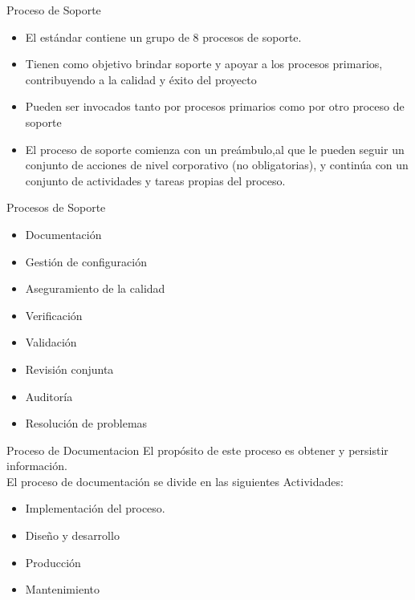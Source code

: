 \documentclass{beamer}
\begin{document}
			\begin{frame}{Proceso de Soporte}
				\begin{itemize}
					\item El estándar contiene un grupo de 8 procesos de soporte.
					\item Tienen como objetivo brindar soporte y apoyar a los procesos primarios, contribuyendo a la calidad y éxito del proyecto
					\item Pueden ser invocados tanto por procesos primarios como por otro proceso de soporte
					\item El proceso de soporte comienza con un preámbulo,al que le pueden seguir un conjunto de acciones de nivel corporativo (no obligatorias), y continúa con un conjunto de actividades y tareas propias del proceso.
				\end{itemize}
			\end{frame}
			
			\begin{frame}{Procesos de Soporte}
				\begin{itemize}
					\item Documentación
					\item Gestión de configuración
					\item Aseguramiento de la calidad
					\item Verificación
					\item Validación
					\item Revisión conjunta
					\item Auditoría
					\item Resolución de problemas
				\end{itemize}
			\end{frame}
			
			\begin{frame}{Proceso de Documentacion}
				El propósito de este proceso es obtener y persistir información.\\
				
				El proceso de documentación se divide en las siguientes Actividades:
					\begin{itemize}
						\item Implementación del proceso.
						\item Diseño y desarrollo
						\item Producción
						\item Mantenimiento
					\end{itemize}
			\end{frame}
			
\end{document}
